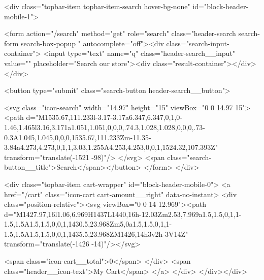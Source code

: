 {{{{{{{<div class="topbar-item topbar-item-search hover-bg-none" id="block-header-mobile-1">
  
<form action="/search" method="get" role="search" class="header-search search-form search-box-popup " autocomplete="off"><div class="search-input-container">
    <input type="text" name="q" class="header-search__input" value=""
      placeholder="Search our store"><div class="result-container"></div></div>

  <button type="submit" class="search-button header-search__button">
    
<svg class="icon-search" width="14.97" height="15" viewBox="0 0 14.97 15">
<path d="M1535.67,111.233l-3.17-3.17a6.347,6.347,0,1,0-1.46,1.465l3.16,3.171a1.051,1.051,0,0,0,.74.3,1.028,1.028,0,0,0,.73-0.3A1.045,1.045,0,0,0,1535.67,111.233Zm-11.35-3.84a4.273,4.273,0,1,1,3.03,1.255A4.253,4.253,0,0,1,1524.32,107.393Z" transform="translate(-1521 -98)"/>
</svg>
<span class="search-button__title">Search</span></button>
</form>
</div>

<div class="topbar-item cart-wrapper" id="block-header-mobile-0">
            <a href="/cart" class="icon-cart cart-amount__right" data-no-instant>
              <div class="position-relative"><svg viewBox="0 0 14 12.969"><path d="M1427.97,16l1.06,6.969H1437L1440,16h-12.03Zm2.53,7.969a1.5,1.5,0,1,1-1.5,1.5A1.5,1.5,0,0,1,1430.5,23.968Zm5,0a1.5,1.5,0,1,1-1.5,1.5A1.5,1.5,0,0,1,1435.5,23.968ZM1426,14h3v2h-3V14Z" transform="translate(-1426 -14)"/></svg>

                <span class="icon-cart__total">0</span>
              </div>
              <span class="header__icon-text">My Cart</span>
            </a>
          </div>
    </div></div>

}}}}}}}
